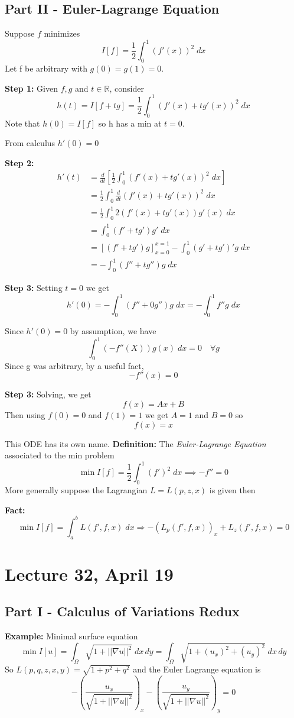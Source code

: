 \documentclass[12pt]{article}
\begin{document}
\subsection*{Part II - Euler-Lagrange Equation}
Suppose $f$ minimizes
\[I[f] = \frac{1}{2}\int_0^1 (f'(x))^2 \; dx\]
Let f be arbitrary with $g(0) = g(1) =0$.

\textbf{Step 1:} Given $f, g$ and $t \in \mathbb{R}$, consider 
\[h(t) = I[f + tg] = \frac{1}{2}\int_0^1 (f'(x) + tg'(x))^2\; dx\]
Note that $h(0) = I[f]$ so h has a min at $t = 0$.

From calculus $h'(0) = 0$

\textbf{Step 2:}
\begin{align*}
    h'(t) &= \frac{d}{dt}\left[\frac{1}{2}\int_0^1 (f'(x) + tg'(x))^2\; dx\right]\\
    &= \frac{1}{2}\int_0^1 \frac{d}{dt}(f'(x) + tg'(x))^2\; dx\\
    &= \frac{1}{2}\int_0^1 2(f'(x) + tg'(x))g'(x)\; dx\\
    &= \int_0^1 (f' + tg')g' \; dx\\
    &= [(f' + tg')g]_{x=0}^{x=1} - \int_0^1 (g' + tg')' g\; dx\\
    &= -\int_0^1 (f'' + tg'')g\; dx
\end{align*}

\textbf{Step 3:} Setting $t= 0$ we get 
\[h'(0) = -\int_0^1 (f'' + 0g'')g\; dx = -\int_0^1 f''g\; dx\]

Since $h'(0) = 0$ by assumption, we have 
\[\int_0^1 (-f''(X))g(x)\; dx = 0 \quad \forall g\]
Since g was arbitrary, by a useful fact,
\[-f''(x) = 0\]

\textbf{Step 3:} Solving, we get 
\[f(x) = Ax + B\]
Then using $f(0) = 0$ and $f(1) = 1$ we get $A = 1$ and $B = 0$ so 
\[\boxed{f(x) = x}\]

This ODE has its own name.
\textbf{Definition:} The \emph{Euler-Lagrange Equation} associated to the min problem 
\[\min I[f] = \frac{1}{2}\int_0^1 (f')^2\; dx \implies -f'' = 0\]
More generally suppose the Lagrangian $L = L(p, z, x)$ is given then 

\textbf{Fact:}
\[\min I[f] = \int_a^b L(f', f, x)\; dx \Longrightarrow -(L_p(f', f, x))_x + L_z(f', f, x) = 0\]

\section*{Lecture 32, April 19}
\subsection{Part I - Calculus of Variations Redux}
\textbf{Example:} Minimal surface equation 
\[\min I[u] = \int_{\Omega} \sqrt{1 + ||\nabla u||^2} \; dx\, dy = \int_{\Omega} \sqrt{1 + (u_x)^2  +(u_y)^2}\; dx\, dy\]
So $L(p, q, z, x, y) = \sqrt{1 + p^2 + q^2}$ and the Euler Lagrange equation is 
\[-\left(\frac{u_x}{\sqrt{1  +||\nabla u||^2}}\right)_x - \left(\frac{u_y}{\sqrt{1 + ||\nabla u||^2}}\right)_y = 0\]
\end{document}
